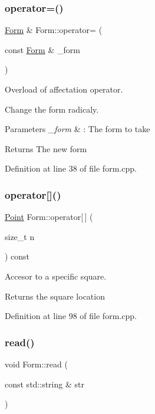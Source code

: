 \subsubsection{\texorpdfstring{operator=()}{operator=()}}
{\footnotesize\ttfamily \hyperlink{class_form}{Form} \& Form\+::operator= (\begin{DoxyParamCaption}\item[{const \hyperlink{class_form}{Form} \&}]{\+\_\+form }\end{DoxyParamCaption})}



Overload of affectation operator. 

Change the form radicaly.


\begin{DoxyParams}{Parameters}
{\em \+\_\+form} & \+: The form to take\\
\hline
\end{DoxyParams}
\begin{DoxyReturn}{Returns}
The new form 
\end{DoxyReturn}


Definition at line 38 of file form.\+cpp.

\hypertarget{class_form_a9c1a9c10ec318bac8c67a8c7d9d5e1ed}{}\label{class_form_a9c1a9c10ec318bac8c67a8c7d9d5e1ed} 
\subsubsection{\texorpdfstring{operator[]()}{operator[]()}}
{\footnotesize\ttfamily \hyperlink{struct_point}{Point} Form\+::operator\mbox{[}$\,$\mbox{]} (\begin{DoxyParamCaption}\item[{size\+\_\+t}]{n }\end{DoxyParamCaption}) const}



Accesor to a specific square. 

\begin{DoxyReturn}{Returns}
the square location 
\end{DoxyReturn}


Definition at line 98 of file form.\+cpp.

\hypertarget{class_form_aedc0125caaf7c1fcbc8c5104a7bd0154}{}\label{class_form_aedc0125caaf7c1fcbc8c5104a7bd0154} 
\subsubsection{\texorpdfstring{read()}{read()}}
{\footnotesize\ttfamily void Form\+::read (\begin{DoxyParamCaption}\item[{const std\+::string \&}]{str }\end{DoxyParamCaption})}



